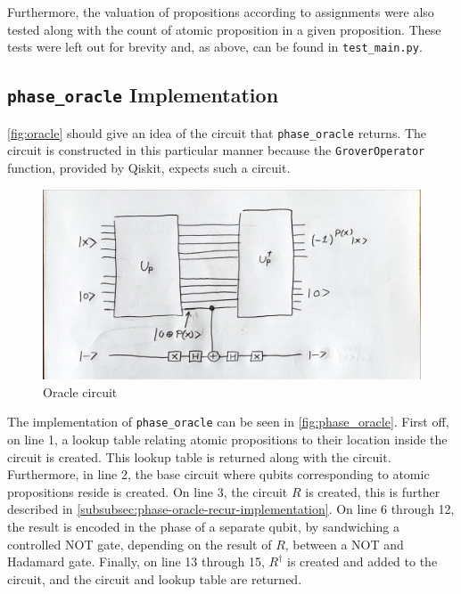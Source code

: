 Furthermore, the valuation of propositions according to assignments were also tested along with the count of atomic proposition in a given proposition.
These tests were left out for brevity and, as above, can be found in \texttt{test\_main.py}.

\subsection{\texttt{phase\_oracle} Implementation}\label{subsec:phase-oracle}

\autoref{fig:oracle} should give an idea of the circuit that \texttt{phase\_oracle} returns.
The circuit is constructed in this particular manner because the \texttt{GroverOperator} function, provided by Qiskit, expects such a circuit.

\begin{figure}[H]
    \centering
    \includegraphics[width=\textwidth]{figures/garbage-free-computation.jpg}
    \caption{Oracle circuit}
    \label{fig:oracle}
\end{figure}

The implementation of \texttt{phase\_oracle} can be seen in \autoref{fig:phase_oracle}.
First off, on line 1, a lookup table relating atomic propositions to their location inside the circuit is created.
This lookup table is returned along with the circuit.
Furthermore, in line 2, the base circuit where qubits corresponding to atomic propositions reside is created.
On line 3, the circuit $R$ is created, this is further described in \autoref{subsubsec:phase-oracle-recur-implementation}.
On line 6 through 12, the result is encoded in the phase of a separate qubit, by sandwiching a controlled NOT gate, depending on the result of $R$, between a NOT and Hadamard gate.
Finally, on line 13 through 15, $R^\dagger$ is created and added to the circuit, and the circuit and lookup table are returned.

